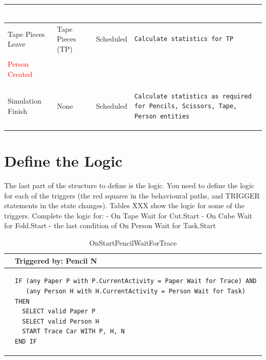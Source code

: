\documentclass[
  10pt,
  a4paperpaper,
  DIV=11,
  numbers=noendperiod,
  oneside]{scrreprt}
\begin{document}
\begin{longtable}{@{}>{\raggedright\arraybackslash}p{1.5cm}>{\raggedright\arraybackslash}p{2.1cm}>{\raggedright\arraybackslash}p{2.2cm}>{\raggedright\arraybackslash}p{10cm}@{}}
\begin{lstlisting}[language=CMPseudo]
  \end{lstlisting}
  \\ \midrule
Tape Pieces Leave & Tape Pieces (TP)  & Scheduled  & 
  \begin{lstlisting}[language=CMPseudo]
Calculate statistics for TP
  \end{lstlisting}
  \\ \midrule
  \textcolor{Red}{Person Created} &  &   & 
  \begin{lstlisting}[language=CMPseudo]
 
  \end{lstlisting}
  \\ \midrule
  Simulation Finish & None  & Scheduled  & 
  \begin{lstlisting}[language=CMPseudo]
Calculate statistics as required for Pencils, Scissors, Tape, Person entities
  \end{lstlisting}
  \\ \bottomrule
  

\end{longtable}

\section{Define the Logic}\label{define-the-logic-1}

The last part of the structure to define is the logic. You need to
define the logic for each of the triggers (the red squares in the
behavioural paths, and TRIGGER statements in the state changes). Tables
XXX show the logic for some of the triggers. Complete the logic for: -
On Tape Wait for Cut.Start - On Cube Wait for Fold.Start - the last
condition of On Person Wait for Task.Start

\begin{longtable}{@{}>{\raggedright\arraybackslash}p{0.25cm}>{\raggedright\arraybackslash}p{13cm}@{}}

\caption{\label{tbl-start_pencil_wait_trace}OnStartPencilWaitForTrace}

\tabularnewline

  \toprule
   & Triggered by: Pencil N\\ \midrule 
  &
\begin{lstlisting}[language=CMPseudo]
IF (any Paper P with P.CurrentActivity = Paper Wait for Trace) AND
   (any Person H with H.CurrentActivity = Person Wait for Task) THEN
  SELECT valid Paper P
  SELECT valid Person H
  START Trace Car WITH P, H, N
END IF
\end{lstlisting}
  \\ \bottomrule
  

\end{longtable}
\end{document}
